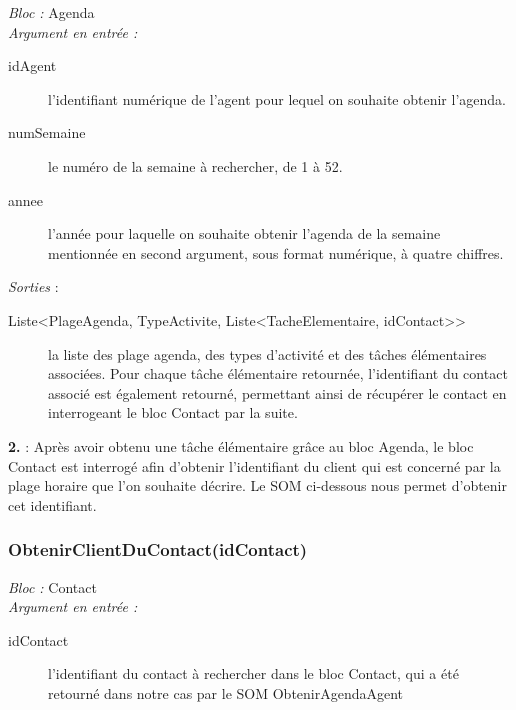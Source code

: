 \noindent \textit{Bloc : } Agenda\\

\noindent \textit{Argument en entrée :}
\begin{description}
\item[idAgent] l'identifiant numérique de l'agent pour lequel on souhaite obtenir l'agenda. 
\item[numSemaine] le numéro de la semaine à rechercher, de 1 à 52. 
\item[annee] l'année pour laquelle on souhaite obtenir l'agenda de la semaine mentionnée en second argument, sous format numérique, à quatre chiffres. \\
\end{description}

\noindent \textit{Sorties} :
\begin{description}
\item[Liste<PlageAgenda, TypeActivite, Liste<TacheElementaire, idContact>>] la liste des plage agenda, des types d'activité et des tâches élémentaires associées. Pour chaque tâche élémentaire retournée, l'identifiant du contact associé est également retourné, permettant ainsi de récupérer le contact en interrogeant le bloc Contact par la suite. \\
\end{description}

\begin{shaded}
\textbf{2.} : Après avoir obtenu une tâche élémentaire grâce au bloc Agenda, le bloc Contact est interrogé afin d'obtenir l'identifiant du client qui est concerné par la plage horaire que l'on souhaite décrire. Le SOM ci-dessous nous permet d'obtenir cet identifiant.
\end{shaded}

\subsubsection{ObtenirClientDuContact(idContact)}

\noindent \textit{Bloc : } Contact \\


\noindent \textit{Argument en entrée :}
\begin{description}
\item[idContact] l'identifiant du contact à rechercher dans le bloc Contact, qui a été retourné dans notre cas par le SOM ObtenirAgendaAgent \\
\end{description}

